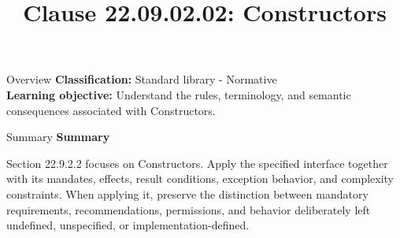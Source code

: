 \documentclass[10pt,letterpaper]{article}
\title{Clause 22.09.02.02: Constructors}
\author{}
\date{}
\begin{document}
\maketitle
\begin{CornellOverviewBox}{Overview}
\textbf{Classification:} Standard library - Normative\\[2pt]
\textbf{Learning objective:} Understand the rules, terminology, and semantic consequences associated with Constructors.
\end{CornellOverviewBox}\begin{CornellSummaryBox}{Summary}
{\sffamily\bfseries\color{Accent} Summary}\par\vspace{3pt}Section 22.9.2.2 focuses on Constructors. Apply the specified interface together with its mandates, effects, result conditions, exception behavior, and complexity constraints. When applying it, preserve the distinction between mandatory requirements, recommendations, permissions, and behavior deliberately left undefined, unspecified, or implementation-defined.
\end{CornellSummaryBox}
\end{document}
